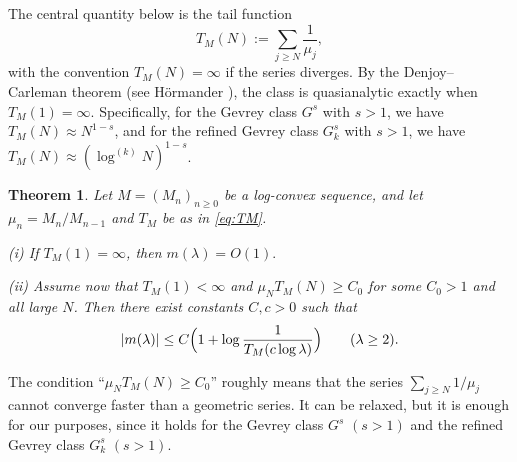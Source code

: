 \documentclass[11pt]{amsart}
\newtheorem{theorem}{Theorem}[section]
\newcommand{\1}{{\rm 1\hspace*{-0.4ex}%
			\rule{0.1ex}{1.52ex}\hspace*{0.2ex}}}
\numberwithin{equation}{section}
\begin{document}
The central quantity below is the tail function
\begin{equation}\label{eq:TM}
	T_M(N):=\sum_{j\ge N}\frac1{\mu_j},
\end{equation}
with the convention $T_M(N)=\infty$ if the series diverges. By the Denjoy--Carleman theorem (see H\"ormander \cite[Theorem 1.3.8]{hor1}), the class is quasianalytic exactly when $T_M(1)=\infty$. Specifically, for the Gevrey class $G^s$ with $s>1$, we have $T_M(N)\approx N^{1-s}$, and for the refined Gevrey class $G_k^s$ with $s>1$, we have $T_M(N)\approx (\log^{(k)}N)^{1-s}$.

\begin{theorem}\label{thm:main3}
	Let $M=(M_n)_{n\ge 0}$ be a log-convex sequence, and let $\mu_n=M_n/M_{n-1}$ and $T_M$ be as in \eqref{eq:TM}.
	
	\smallskip
	\noindent
	\textup{(i)} If $T_M(1)=\infty$, then $m(\lambda)=O(1).$
	
	\smallskip
	\noindent
	\textup{(ii)} Assume now that $T_M(1)<\infty$ and $\mu_NT_M(N)\ge C_0$ for some $C_0>1$ and all large $N$.
	Then there exist constants $C,c>0$ such that
	\begin{equation}\label{ub3}
		|m(\lambda)|\le C\Bigl(1+\log \frac1{T_M(c\log \lambda)}\Bigr)
		\qquad (\lambda\ge 2).
	\end{equation}
\end{theorem}
The condition ``$\mu_NT_M(N)\ge C_0$'' roughly means that the series $\sum_{j\ge N}1/\mu_j$ cannot converge faster than a geometric series. It can be relaxed, but it is enough for our purposes, since it holds for the Gevrey class $G^s$ $(s>1)$ and the refined Gevrey class $G_k^s$ $(s>1)$.
\end{document}
